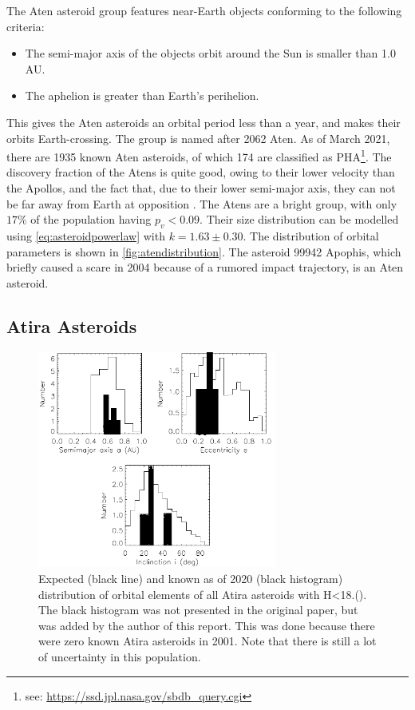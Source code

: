 The Aten asteroid group features near-Earth objects conforming to the following criteria:
\begin{itemize}
    \item The semi-major axis of the objects orbit around the Sun is smaller than 1.0 AU.
    \item The aphelion is greater than Earth's perihelion.
\end{itemize}

This gives the Aten asteroids an orbital period less than a year, and makes their orbits Earth-crossing. The group is named after 2062 Aten. As of March 2021, there are 1935 known Aten asteroids, of which 174 are classified as PHA\footnote{see: \url{https://ssd.jpl.nasa.gov/sbdb_query.cgi}}. The discovery fraction of the Atens is quite good, owing to their lower velocity than the Apollos, and the fact that, due to their lower semi-major axis, they can not be far away from Earth at opposition \cite{debiased}. The Atens are a bright group, with only $17\%$ of the population having $p_v < 0.09$. Their size distribution can be modelled using \autoref{eq:asteroidpowerlaw} with $k = 1.63\pm0.30$. \cite{subpopulations} The distribution of orbital parameters is shown in \autoref{fig:atendistribution}. The asteroid 99942 Apophis, which briefly caused a scare in 2004 because of a rumored impact trajectory, is an Aten asteroid.

\newpage
\subsection{Atira Asteroids}
\begin{figure}[htb]
    \centering
    \includegraphics[width=0.7\textwidth]{images/atiradist.png}
    \caption{Expected (black line) and known as of 2020 (black histogram) distribution of orbital elements of all Atira asteroids with H<18.(\cite{debiased}). The black histogram was not presented in the original paper, but was added by the author of this report. This was done because there were zero known Atira asteroids in 2001. Note that there is still a lot of uncertainty in this population.}
    \label{fig:atiradistribution}
\end{figure}

